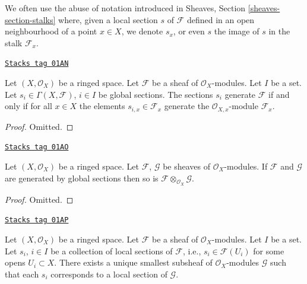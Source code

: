 We often use the abuse of notation introduced in
Sheaves, Section \ref{sheaves-section-stalks} where, given a local
section $s$ of $\mathcal{F}$ defined in an open neighbourhood
of a point $x \in X$, we denote $s_x$, or even $s$ the image of $s$
in the stalk $\mathcal{F}_x$.

\begin{lemma}
\label{modules-lemma-globally-generated}
\href{https://stacks.math.columbia.edu/tag/01AN}{\texttt{Stacks tag 01AN}}

Let $(X, \mathcal{O}_X)$ be a ringed space.
Let $\mathcal{F}$ be a sheaf of $\mathcal{O}_X$-modules.
Let $I$ be a set. Let
$s_i \in \Gamma(X, \mathcal{F})$, $i \in I$
be global sections. The sections $s_i$ generate
$\mathcal{F}$ if and only if for all $x\in X$ the
elements $s_{i, x} \in \mathcal{F}_x$ generate
the $\mathcal{O}_{X, x}$-module $\mathcal{F}_x$.
\end{lemma}

\begin{proof}
Omitted.
\end{proof}

\begin{lemma}
\label{modules-lemma-tensor-product-globally-generated}
\href{https://stacks.math.columbia.edu/tag/01AO}{\texttt{Stacks tag 01AO}}


Let $(X, \mathcal{O}_X)$ be a ringed space.
Let $\mathcal{F}$, $\mathcal{G}$ be sheaves of $\mathcal{O}_X$-modules.
If $\mathcal{F}$ and $\mathcal{G}$ are generated by global sections
then so is $\mathcal{F} \otimes_{\mathcal{O}_X} \mathcal{G}$.
\end{lemma}

\begin{proof}
Omitted.
\end{proof}

\begin{lemma}
\label{modules-lemma-generated-by-local-sections}
\href{https://stacks.math.columbia.edu/tag/01AP}{\texttt{Stacks tag 01AP}}

Let $(X, \mathcal{O}_X)$ be a ringed space.
Let $\mathcal{F}$ be a sheaf of $\mathcal{O}_X$-modules.
Let $I$ be a set. Let $s_i$, $i \in I$ be a collection
of local sections of $\mathcal{F}$, i.e., $s_i \in \mathcal{F}(U_i)$
for some opens $U_i \subset X$. There exists a unique smallest
subsheaf of $\mathcal{O}_X$-modules $\mathcal{G}$ such
that each $s_i$ corresponds to a local section of
$\mathcal{G}$.
\end{lemma}

